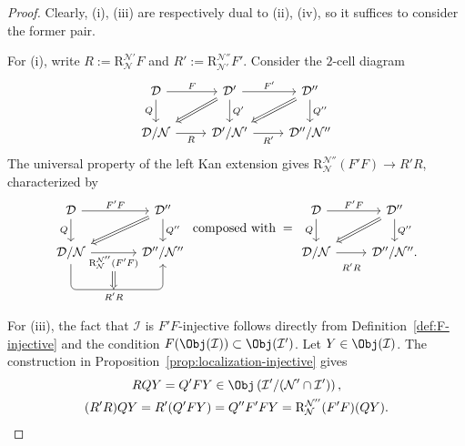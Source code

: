 \begin{proof}
	Clearly, (i), (iii) are respectively dual to (ii), (iv), so it suffices to
	consider the former pair.

	For (i), write $R:=\mathrm{R}^{\mathcal{N}'}_{\mathcal{N}}F$ and
	$R':=\mathrm{R}^{\mathcal{N}''}_{\mathcal{N}'}F'$. Consider the $2$-cell
	diagram
	\[\begin{tikzcd}
		\mathcal{D} \arrow[r, "F"] \arrow[d, "Q"'] & \mathcal{D}' \arrow[r, "{F'}"] \arrow[d, "{Q'}"] \arrow[Rightarrow, ld] & \mathcal{D}'' \arrow[d, "{Q''}"] \arrow[Rightarrow, ld] \\
		\mathcal{D}/\mathcal{N} \arrow[r, "R"'] & \mathcal{D}'/\mathcal{N}' \arrow[r, "{R'}"'] & \mathcal{D}''/\mathcal{N}''
	\end{tikzcd}\]
	The universal property of the left Kan extension gives
	$\mathrm{R}^{\mathcal{N}''}_{\mathcal{N}}(F'F)\to R'R$, characterized by
	\begin{equation}\label{eqn:R-composite-aux}\begin{tikzcd}[column sep=large]
			\mathcal{D} \arrow[r, "{F' F}"] \arrow[d, "Q"'] & \mathcal{D}'' \arrow[d, "{Q''}"] \arrow[Rightarrow, ld] \\
			\mathcal{D}/\mathcal{N} \arrow[r, "{\mathrm{R}^{\mathcal{N}''}_{\mathcal{N}} (F'F) }"' {below, name=R}] \arrow[r, "{R' R}"{below, name=RR, pos=0.465}, rounded corners, to path={-- ([yshift=-2em]\tikztostart.south) -- ([yshift=-2em] \tikztotarget.south) [midway]\tikztonodes -- (\tikztotarget) }] & \mathcal{D}''/\mathcal{N}''
			\arrow[Rightarrow, from=R, to=RR]
		\end{tikzcd} \;\text{composed with}\; = \begin{tikzcd}
			\mathcal{D} \arrow[r, "{F' F}"] \arrow[d, "Q"'] & \mathcal{D}'' \arrow[d, "{Q''}"] \arrow[Rightarrow, ld] \\
			\mathcal{D}/\mathcal{N} \arrow[r, "{R'R}"' inner sep=0.8em] & \mathcal{D}''/\mathcal{N}'' .
		\end{tikzcd}\end{equation}

	For (iii), the fact that $\mathcal{I}$ is $F'F$-injective follows directly
	from Definition~\ref{def:F-injective} and the condition
	$F(\Obj(\mathcal{I}))\subset\Obj(\mathcal{I}')$. Let
	$Y\in\Obj(\mathcal{I})$. The construction in
	Proposition~\ref{prop:localization-injective} gives
	\begin{gather*}
		RQY = Q'FY \in \Obj \left(\mathcal{I}'/(\mathcal{N}'\cap\mathcal{I}')\right), \\
		(R'R)QY = R'(Q'FY) = Q'' F'FY = \mathrm{R}^{\mathcal{N}''}_{\mathcal{N}} (F' F)(QY).
	\end{gather*}


\end{proof}
